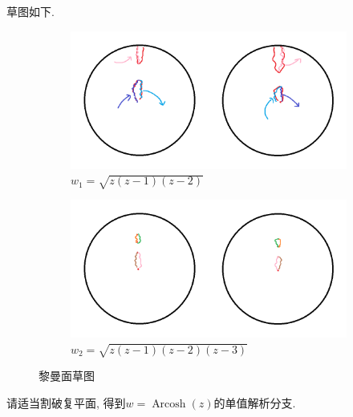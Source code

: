 \documentclass[a4paper,12pt]{ctexart}
\DeclareMathOperator{\Arcosh}{Arcosh}
\begin{document}
    \begin{solution}
        草图如下.
        \begin{figure}[H]
            \begin{subfigure}{.49\textwidth}
                \centering
                \includegraphics[scale=0.25]{riemann_3.png}
                \caption{$w_{1}=\sqrt{z(z-1)(z-2)}$}
                \label{figure_riemann_3}
            \end{subfigure}   
            \begin{subfigure}{.49\textwidth}
                \centering
                \includegraphics[scale=0.25]{riemann_4.png}
                \caption{$w_{2}=\sqrt{z(z-1)(z-2)(z-3)}$}
                \label{figure_riemann_4}
            \end{subfigure}
            \caption{黎曼面草图}
            \label{figure_riemann}
        \end{figure}
    \end{solution}

    \begin{problem}
        请适当割破复平面, 得到$w=\Arcosh(z)$的单值解析分支.
    \end{problem}
\end{document}
